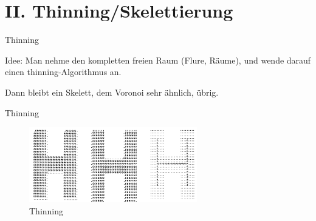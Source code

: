 \section{II. Thinning/Skelettierung}
\begin{frame}{Thinning}
\begin{center}
 Idee: Man nehme den kompletten freien Raum (Flure, Räume), und wende darauf einen thinning-Algorithmus an.
 \bigbreak
 
 Dann bleibt ein Skelett, dem Voronoi sehr ähnlich, übrig.
 
 \end{center}
\end{frame}

\begin{frame}{Thinning}

\begin{figure}[h]
 \centering
 \includegraphics[width=0.65\textwidth]{./material/thinning1.png}
 \caption{Thinning \cite{ZhangSuen}}
 \label{fig:gesamt}
\end{figure}
 
\end{frame}

